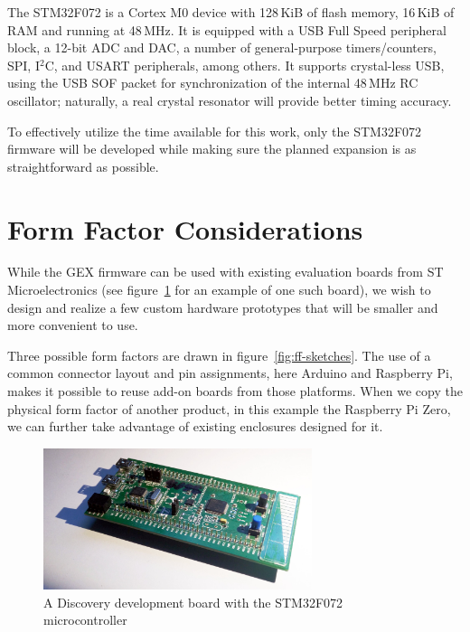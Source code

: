 The STM32F072 is a Cortex M0 device with 128\,KiB of flash memory, 16\,KiB of \gls{RAM} and running at 48\,MHz. It is equipped with a \gls{USB} Full Speed peripheral block, a 12-bit \gls{ADC} and \gls{DAC}, a number of general-purpose timers/counters, SPI, I$^2$C, and USART peripherals, among others. It supports crystal-less \gls{USB}, using the USB SOF packet for synchronization of the internal 48\,MHz RC oscillator; naturally, a real crystal resonator will provide better timing accuracy.

To effectively utilize the time available for this work, only the STM32F072 firmware will be developed while making sure the planned expansion is as straightforward as possible.

\section{Form Factor Considerations}

While the GEX firmware can be used with existing evaluation boards from ST Microelectronics (see figure~\ref{fig:discovery} for an example of one such board), we wish to design and realize a few custom hardware prototypes that will be smaller and more convenient to use.

Three possible form factors are drawn in figure~\ref{fig:ff-sketches}. The use of a common connector layout and pin assignments, here Arduino and Raspberry Pi, makes it possible to reuse add-on boards from those platforms. When we copy the physical form factor of another product, in this example the Raspberry Pi Zero, we can further take advantage of existing enclosures designed for it.

\begin{figure}[h]
	\centering
	\includegraphics[width=0.7\textwidth] {img/disco072.jpg}
	\caption[A Discovery board with STM32F072]{\label{fig:discovery}A Discovery development board with the STM32F072 microcontroller}
\end{figure}

